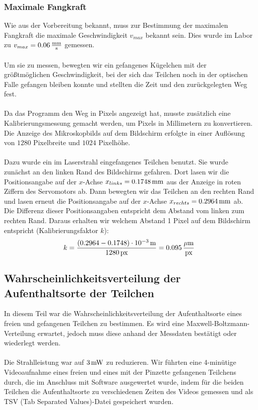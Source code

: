 \documentclass[a4paper,titlepage]{scrartcl}
\numberwithin{equation}{section}
\begin{document}
\subsubsection{Maximale Fangkraft}
Wie aus der Vorbereitung bekannt, muss zur Bestimmung der maximalen Fangkraft die maximale Geschwindigkeit $v_{max}$ bekannt sein. Dies wurde im Labor zu $v_{max}=\unit[0.06]{\frac{mm}{s}}$ gemessen.\\ \\
Um sie zu messen, bewegten wir ein gefangenes Kügelchen mit der größtmöglichen Geschwindigkeit, bei der sich das Teilchen noch in der optischen Falle gefangen bleiben konnte und stellten die Zeit und den zurückgelegten Weg fest.\\\\
Da das Programm den Weg in Pixels angezeigt hat, musste zusätzlich eine Kalibrierungsmessung gemacht werden, um Pixels in Millimetern zu konvertieren. Die Anzeige des Mikroskopbilds auf dem Bildschirm erfolgte in einer Auflösung von $1280$ Pixelbreite und $1024$ Pixelhöhe.\\ \\
Dazu wurde ein im Laserstrahl eingefangenes Teilchen benutzt. Sie wurde zunächst an den linken Rand des Bildschirms gefahren. Dort lasen wir die Positionsangabe auf der $x$-Achse $x_{links}=\unit[0.1748]{mm}$ aus der Anzeige in roten Ziffern des Servomotors ab. Dann bewegten wir das Teilchen an den rechten Rand und lasen erneut die Positionsangabe auf der $x$-Achse $x_{rechts}=\unit[0.2964]{mm}$ ab. Die Differenz dieser Positionsangaben entspricht dem Abstand vom linken zum rechten Rand. Daraus erhalten wir welchem Abstand 1 Pixel auf dem Bildschirm entspricht (Kalibrierungsfaktor $k$):
\begin{equation*}
k=\frac{\unit[(0.2964 - 0.1748) \cdot 10^{-3}]{m}}{\unit[1280]{px}}=\unit[0.095]{\frac{\mu m}{px}}
\end{equation*}
\subsection{Wahrscheinlichkeitsverteilung der Aufenthaltsorte der Teilchen}
In diesem Teil war die Wahrscheinlichkeitsverteilung der Aufenthaltsorte eines freien und gefangenen Teilchen zu bestimmen. Es wird eine Maxwell-Boltzmann-Verteilung erwartet, jedoch muss diese anhand der Messdaten bestätigt oder wiederlegt werden.\\ \\
Die Strahlleistung war auf $\unit[3]{mW}$ zu reduzieren. Wir führten eine 4-minütige Videoaufnahme eines freien und eines mit der Pinzette gefangenen Teilchens durch, die im Anschluss mit Software ausgewertet wurde, indem für die beiden Teilchen die Aufenthaltsorte zu verschiedenen Zeiten des Videos gemessen und als TSV (Tab Separated Values)-Datei gespeichert wurden.
\end{document}
